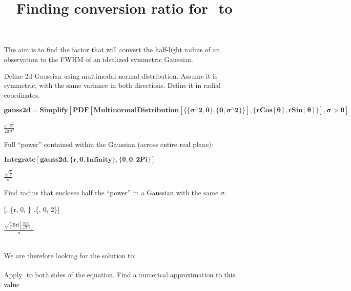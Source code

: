 \documentclass{article}
\begin{document}
\title{Finding conversion ratio for \(\) to \(\)}
\author{}
\date{}
\maketitle

The aim is to find the factor that will convert the half-light radius of an observation to the FWHM of an idealized symmetric Gaussian.

Define 2d Gaussian using multimodal normal distribution. Assume it is symmetric, with the same variance in both directions. Define it in radial coordinates.

\begin{doublespace}
\noindent\(\pmb{\text{gauss2d}=\text{Simplify}[\text{PDF}[\text{MultinormalDistribution}[\{\{\sigma {}^{\wedge}2,0\},\{0,\sigma {}^{\wedge}2\}\}],\{r
\text{Cos}[\theta ], r \text{Sin}[\theta ]\}], \sigma >0]}\)
\end{doublespace}

\begin{doublespace}
\noindent\(\frac{e^{-\frac{r^2}{2 \sigma ^2}}}{2 \pi  \sigma ^2}\)
\end{doublespace}

Full {``}power{''} contained within the Gaussian (across entire real plane):

\begin{doublespace}
\noindent\(\pmb{\text{Integrate}[\text{gauss2d},\{r,0,\text{Infinity}\},\{\theta ,0,2\text{Pi}\}]}\)
\end{doublespace}

\begin{doublespace}
\noindent\(\frac{\sqrt{\frac{\pi }{2}}}{\sigma }\)
\end{doublespace}

Find radius that encloses half the {``}power{''} in a Gaussian with the same $\sigma $.

[, \{r, 0, \} ,\{\theta , 0, 2\}]

\begin{doublespace}
\noindent\(\frac{\sqrt{\frac{\pi }{2}} \text{Erf}\left[\frac{\text{R50}}{\sqrt{2} \sigma }\right]}{\sigma }\)
\end{doublespace}

\(\)\\
\\
We are therefore looking for the solution to:\\
\\
\(\)\\
Apply \(\) to both sides of the equation. Find a numerical approximation to this value
\end{document}
